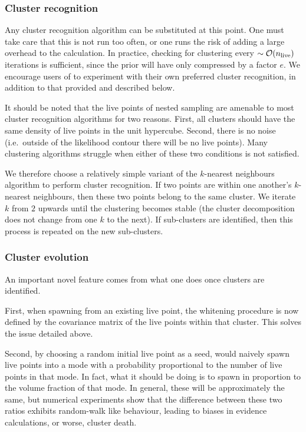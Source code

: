 \subsubsection{Cluster recognition}
\label{sec:pc:clustering_recognition}
Any cluster recognition algorithm can be substituted at this point.  One must take care that this is not run too often, or one runs the risk of adding a large overhead to the calculation.  In practice, checking for clustering every ${\sim\mathcal{O}{\left(n_{\mathrm{live}}\right)}}$ iterations is sufficient, since the prior will have only compressed by a factor $e$.  We encourage users of \PolyChord{} to experiment with their own preferred cluster recognition, in addition to that provided and described below. 

It should be noted that the live points of nested sampling are amenable to most cluster recognition algorithms for two reasons.  First, all clusters should have the same density of live points in the unit hypercube.  Second, there is no noise (i.e.\ outside of the likelihood contour there will be no live points). Many clustering algorithms struggle when either of these two conditions is not satisfied.

We therefore choose a relatively simple variant of the $k$-nearest neighbours algorithm to perform cluster recognition.  If two points are within one another's $k$-nearest neighbours, then these two points belong to the same cluster.  We iterate $k$ from $2$ upwards until the clustering becomes stable (the cluster decomposition does not change from one $k$ to the next).  If sub-clusters are identified, then this process is repeated on the new sub-clusters.

\subsubsection{Cluster evolution}
\label{sec:pc:clustering_evolution}
An important novel feature comes from what one does once clusters are identified. 

First, when spawning from an existing live point, the whitening procedure is now defined by the covariance matrix of the live points within that cluster. This solves the issue detailed above.

Second, by choosing a random initial live point as a seed, \PolyChord{} would naively spawn live points into a mode with a probability proportional to the number of live points in that mode. In fact, what it should be doing is to spawn in proportion to the volume fraction of that mode. In general, these will be approximately the same, but numerical experiments show that the difference between these two ratios exhibits random-walk like behaviour, leading to biases in evidence calculations, or worse, cluster death. 

